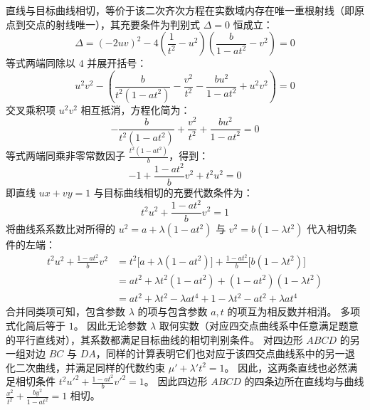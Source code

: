 \begin{solution}
直线与目标曲线相切，等价于该二次齐次方程在实数域内存在唯一重根射线（即原点到交点的射线唯一），其充要条件为判别式 $\Delta = 0$ 恒成立：
$$ \Delta = (-2uv)^2 - 4\left(\frac{1}{t^2} - u^2\right)\left(\frac{b}{1 - at^2} - v^2\right) = 0 $$
等式两端同除以 $4$ 并展开括号：
$$ u^2 v^2 - \left(\frac{b}{t^2(1 - at^2)} - \frac{v^2}{t^2} - \frac{bu^2}{1 - at^2} + u^2 v^2\right) = 0 $$
交叉乘积项 $u^2 v^2$ 相互抵消，方程化简为：
$$ -\frac{b}{t^2(1 - at^2)} + \frac{v^2}{t^2} + \frac{bu^2}{1 - at^2} = 0 $$
等式两端同乘非零常数因子 $\frac{t^2(1 - at^2)}{b}$，得到：
$$ -1 + \frac{1 - at^2}{b} v^2 + t^2 u^2 = 0 $$
即直线 $ux + vy = 1$ 与目标曲线相切的充要代数条件为：
$$ t^2 u^2 + \frac{1 - at^2}{b} v^2 = 1 $$
将曲线系系数比对所得的 $u^2 = a + \lambda(1 - at^2)$ 与 $v^2 = b(1 - \lambda t^2)$ 代入相切条件的左端：
\begin{align*}
t^2 u^2 + \frac{1 - at^2}{b} v^2 &= t^2 \big[a + \lambda(1 - at^2)\big] + \frac{1 - at^2}{b} \big[b(1 - \lambda t^2)\big] \\
&= at^2 + \lambda t^2(1 - at^2) + (1 - at^2)(1 - \lambda t^2) \\
&= at^2 + \lambda t^2 - \lambda a t^4 + 1 - \lambda t^2 - at^2 + \lambda a t^4
\end{align*}
合并同类项可知，包含参数 $\lambda$ 的项与包含参数 $a, t$ 的项互为相反数并相消。
多项式化简后等于 $1$。
因此无论参数 $\lambda$ 取何实数（对应四交点曲线系中任意满足题意的平行直线对），其系数都满足目标曲线的相切判别条件。
对四边形 $ABCD$ 的另一组对边 $BC$ 与 $DA$，同样的计算表明它们也对应于该四交点曲线系中的另一退化二次曲线，并满足同样的代数约束 $\mu' + \lambda' t^2 = 1$。
因此，这两条直线也必然满足相切条件 $t^2 u'^2 + \frac{1 - at^2}{b} v'^2 = 1$。
因此四边形 $ABCD$ 的四条边所在直线均与曲线 $\frac{x^2}{t^2} + \frac{by^2}{1 - at^2} = 1$ 相切。

\end{solution}



